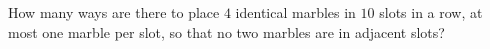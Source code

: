 How many ways are there to place $4$ identical marbles in $10$ slots in a row, at most one marble per slot, so that no two marbles are in adjacent slots?
